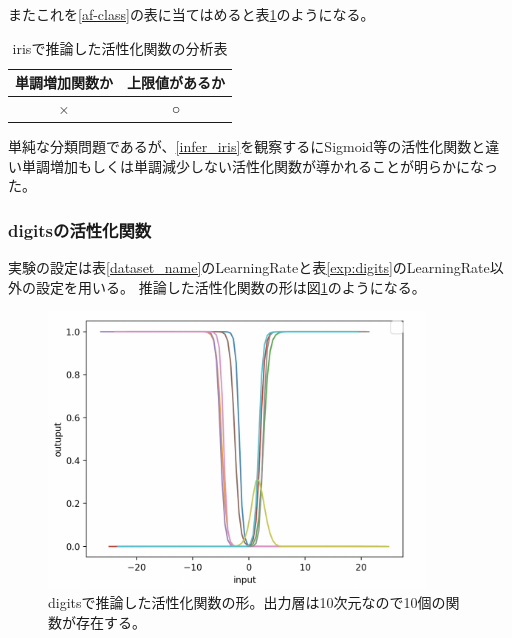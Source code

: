 またこれを\ref{af-class}の表に当てはめると表\ref{anal_iris}のようになる。
\begin{table}[htbp]
    \begin{center}
        \caption{irisで推論した活性化関数の分析表}
        \label{anal_iris}
        \vspace{2mm} 
        \begin{tabular}{ |c|c| }
        \hline
        単調増加関数か & 上限値があるか   \\
        \hline
        × & ○   \\
        \hline
        \end{tabular}
    \end{center}
\end{table}



単純な分類問題であるが、\ref{infer_iris}を観察するにSigmoid等の活性化関数と違い単調増加もしくは単調減少しない活性化関数が導かれることが明らかになった。




\subsubsection{digitsの活性化関数}
\label{evo2:digits_result}
実験の設定は表\ref{dataset_name}のLearningRateと表\ref{exp:digits}のLearningRate以外の設定を用いる。
推論した活性化関数の形は図\ref{infer_digits}のようになる。
\begin{figure}[hbtp]
    \begin{center}
        \includegraphics[width=10cm]{asset/digits-0.1.png}
            \caption{digitsで推論した活性化関数の形。出力層は10次元なので10個の関数が存在する。}
            \label{infer_digits}
    \end{center}
\end{figure}

